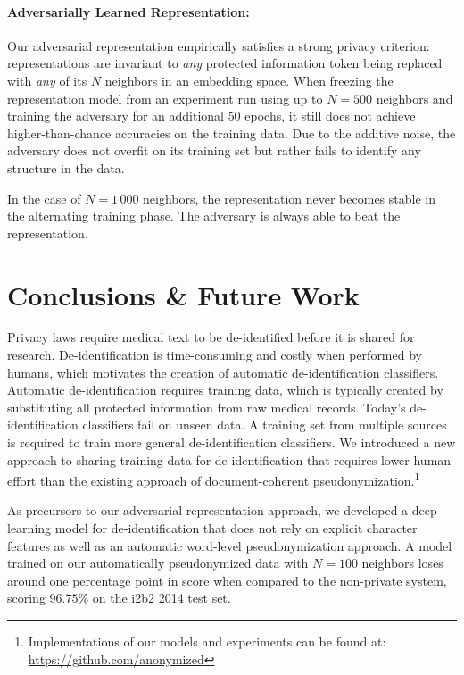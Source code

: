 \paragraph{Adversarially Learned Representation:}
%
Our adversarial representation empirically satisfies a strong privacy criterion: representations are invariant to \textit{any} protected information token being replaced with \textit{any} of its $N$ neighbors in an embedding space.
%
When freezing the representation model from an experiment run using up to $N = 500$ neighbors and training the adversary for an additional $50$ epochs, it still does not achieve higher-than-chance accuracies on the training data.
%
Due to the additive noise, the adversary does not overfit on its training set but rather fails to identify any structure in the data.

%
In the case of $N = 1\,000$ neighbors, the representation never becomes stable in the alternating training phase.
%
The adversary is always able to beat the representation.

\section{Conclusions \& Future Work}
%
Privacy laws require medical text to be de-identified before it is shared for research.
%
De-identifi\-ca\-tion is time-consuming and costly when performed by humans, which motivates the creation of automatic de-identification classifiers.
%
Automatic de-identification requires training data, which is typically created by substituting all protected information from raw medical records.
%
Today's de-identification classifiers fail on unseen data.
%
A training set from multiple sources is required to train more general de-identification classifiers.
%
We introduced a new approach to sharing training data for de-identification that requires lower human effort than the existing approach of document-coherent pseudonymization.\footnote{Implementations of our models and experiments can be found at: \url{https://github.com/anonymized}}

%
As precursors to our adversarial representation approach, we developed a deep learning model for de-identification that does not rely on explicit character features as well as an automatic word-level pseudonymization approach.
%
A model trained on our automatically pseudonymized data with $N=100$ neighbors loses around one percentage point in \fone score when compared to the non-private system, scoring $96.75\%$ on the i2b2 2014 test set.

